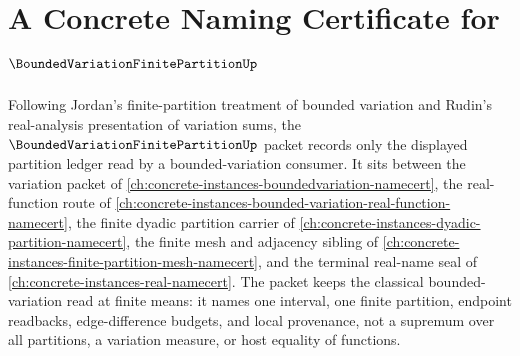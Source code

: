 \chapter{A Concrete Naming Certificate for $\BoundedVariationFinitePartitionUp$}
\label{ch:concrete-instances-bounded-variation-finite-partition-namecert}

Following Jordan's finite-partition treatment of bounded variation and Rudin's real-analysis presentation of variation sums, the $\BoundedVariationFinitePartitionUp$ packet records only the displayed partition ledger read by a bounded-variation consumer. It sits between the variation packet of \autoref{ch:concrete-instances-boundedvariation-namecert}, the real-function route of \autoref{ch:concrete-instances-bounded-variation-real-function-namecert}, the finite dyadic partition carrier of \autoref{ch:concrete-instances-dyadic-partition-namecert}, the finite mesh and adjacency sibling of \autoref{ch:concrete-instances-finite-partition-mesh-namecert}, and the terminal real-name seal of \autoref{ch:concrete-instances-real-namecert}. The packet keeps the classical bounded-variation read at finite means: it names one interval, one finite partition, endpoint readbacks, edge-difference budgets, and local provenance, not a supremum over all partitions, a variation measure, or host equality of functions.

